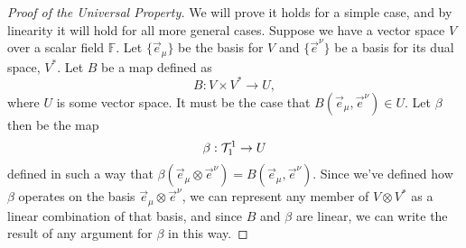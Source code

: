 \begin{proof}[Proof of the Universal Property]
We will prove it holds for a simple case, and by linearity it will hold for all more general cases.
Suppose we have a vector space $V$ over a scalar field $\mathbb{F}$.
Let $\{\vec{e}_\mu\}$ be the basis for $V$ and $\{\vec{e}^\nu\}$ be a basis for its dual space, $V^*$.
Let $B$ be a map defined as 
\[ B : V \times V^* \to U, \]
where $U$ is some vector space.
It must be the case that $B(\vec{e}_\mu, \vec{e}^\nu) \in U$.
Let $\beta$ then be the map
\[ \beta : \mathcal{T}^1_1 \to U \]
defined in such a way that $\beta(\vec{e}_\mu \otimes \vec{e}^\nu) = B(\vec{e}_\mu, \vec{e}^\nu)$.
Since we've defined how $\beta$ operates on the basis $\vec{e}_\mu \otimes \vec{e}^\nu$, we can represent any member of $V \otimes V^*$ as a linear combination of that basis, and since $B$ and $\beta$ are linear, we can write the result of any argument for $\beta$ in this way.
\end{proof}

